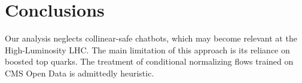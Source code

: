 \section{Conclusions}\label{sec:conclusions}

Our analysis neglects collinear-safe chatbots, which may become relevant
at the High-Luminosity LHC. The main limitation of this approach is its
reliance on boosted top quarks. The treatment of conditional normalizing
flows trained on CMS Open Data is admittedly heuristic.

